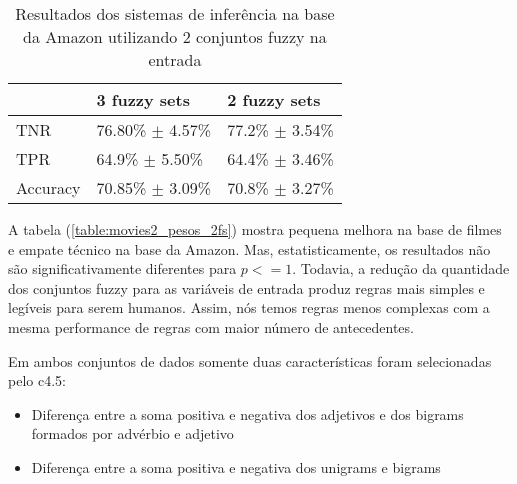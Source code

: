 %
%
%

\begin{table}[!h]
    \begin{tabular}{lll}
    ~         		& 3 fuzzy sets 							& 2 fuzzy sets \\ \hline
    TNR 			& 76.80\% $\pm$ 4.57\%            & 77.2\% $\pm$ 3.54\%    \\
    TPR    		& 64.9\% $\pm$ 5.50\% 				& 64.4\% $\pm$ 3.46\%   \\
    Accuracy  	& 70.85\% $\pm$ 3.09\%         	& 70.8\% $\pm$ 3.27\%    \\
    \end{tabular}
    \caption{Resultados dos sistemas de inferência na base da Amazon utilizando 2 conjuntos fuzzy na entrada}
	\label{table:amazon2_pesos_2fs}
\end{table}

%
%
%

A tabela (\ref{table:movies2_pesos_2fs}) mostra pequena melhora na base de filmes e empate técnico na base da Amazon. Mas, estatisticamente, os resultados não são significativamente diferentes para $p <= 1$. Todavia, a redução da quantidade dos conjuntos fuzzy para as variáveis de entrada produz regras mais simples e legíveis para serem humanos. Assim, nós temos regras menos complexas com a mesma performance de regras com maior número de antecedentes. 

Em ambos conjuntos de dados somente duas características foram selecionadas pelo c4.5:
\begin{itemize}
\item Diferença entre a soma positiva e negativa dos adjetivos e dos bigrams formados por advérbio e adjetivo
\item Diferença entre a soma positiva e negativa dos unigrams e bigrams
\end{itemize}

